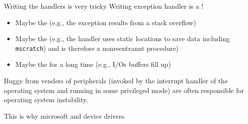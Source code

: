 \begin{parag}{Writing the handlers is very  tricky}%
\label{par:Writing the handlers is very \important{very} tricky}
Writing exception  handler is a !
\begin{itemize}
    \item Maybe the  (e.g., the exception results from a stack overflow)
    \item Maybe the  (e.g., the handler uses static locations to save data including \texttt{mscratch}) and is therefore a nonreentrannt procedure)
    \item Maybe the  for a long time (e.g., I/Os buffers fill up)
\end{itemize}
Buggy  from venders of peripherals (invoked by the interrupt handler of the operating system and running in some privileged mode) are often responsible for operating system instability.\\
\begin{framedremark}
This is why microsoft  and  device drivers.
\end{framedremark}
\end{parag}
